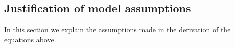 \subsection{Justification of model assumptions}
\label{sect:modelassumptions}
In this section we explain the assumptions made in the derivation of the equations above.
